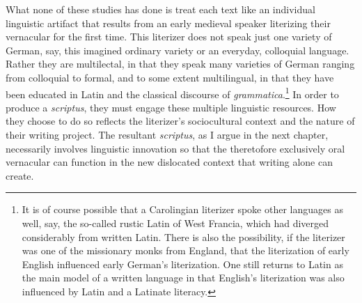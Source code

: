 What none of these studies has done is treat each text like an individual linguistic artifact that results from an early medieval speaker literizing their vernacular for the first time. This literizer does not speak just one variety of German, say, this imagined ordinary variety or an everyday, colloquial language. Rather they are multilectal, in that they speak many varieties of German ranging from colloquial to formal, and to some extent multilingual, in that they have been educated in Latin and the classical discourse of \textit{grammatica}.\footnote{{It is of course possible that a Carolingian literizer spoke other languages as well, say, the so-called rustic Latin of West Francia, which had diverged considerably from written Latin. There is also the possibility, if the literizer was one of the missionary monks from England, that the literization of early English influenced early German’s literization. One still returns to Latin as the main model of a written language in that English’s literization was also influenced by Latin and a Latinate literacy.} } In order to produce a \textit{scriptus}, they must engage these multiple linguistic resources. How they choose to do so reflects the literizer’s sociocultural context and the nature of their writing project. The resultant \textit{scriptus}, as I argue in the next chapter, necessarily involves linguistic innovation so that the theretofore exclusively oral vernacular can function in the new dislocated context that writing alone can create.

